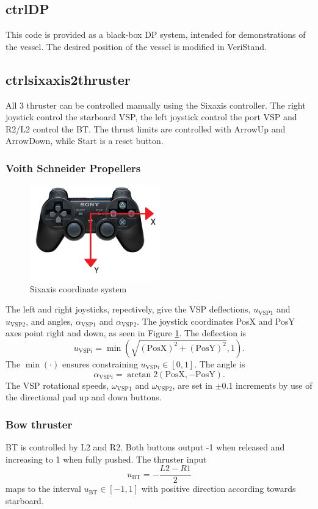 \subsection{ctrl\textunderscore DP}
This code is provided as a black-box DP system, intended for demonstrations of the vessel. The desired position of the vessel is modified in VeriStand. 
\subsection{ctrl\textunderscore sixaxis2thruster}
All 3 thruster can be controlled manually using the Sixaxis controller. The right joystick control the starboard VSP, the left joystick control the port VSP and R2/L2 control the BT. The thrust limits are controlled with ArrowUp and ArrowDown, while Start is a reset button. 
\subsubsection{Voith Schneider Propellers}
\begin{figure}[!h]
	\centering \includegraphics[width=0.5\textwidth]{fig/sixaxis_frame.png}
	\caption{Sixaxis coordinate system}
	
	\label{fig: sixaxis coordinate system} 
\end{figure}
The left and right joysticks, repectively, give the VSP deflections, $u_{\text{VSP1}}$ and $u_{\text{VSP2}}$, and angles, $\alpha_{\text{VSP1}}$ and $\alpha_{\text{VSP2}}$. The joystick coordinates PosX and PosY axes point right and down, as seen in Figure \ref{fig: sixaxis coordinate system}. The deflection is
\[
u_{\text{VSP}i}=\min\left(\sqrt{\left(\text{PosX}\right)^{2}+\left(\text{PosY}\right)^{2}},1\right).
\]
The $\min\left(\cdot\right)$ ensures constraining $u_{\text{VSP}i}\in\left[0,1\right]$. The angle is
\[
\alpha_{\text{VSP}i}=\arctan2\left(\text{PosX},-\text{PosY}\right).
\]
The VSP rotational speeds, $\omega_{\text{VSP1}}$ and $\omega_{\text{VSP2}}$, are set in $\pm0.1$ increments by use of the directional pad up and down buttons.
\subsubsection{Bow thruster}
BT is controlled by L2 and R2. Both buttons output -1 when released and increasing to 1 when fully pushed. The thruster input
\[
u_{\text{BT}}=-\frac{L2-R1}{2}
\] maps to the interval $u_{\text{BT}}\in\left[-1,1\right]$ with positive direction according towards starboard. 
